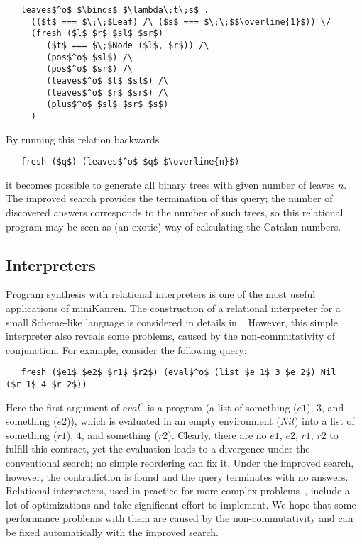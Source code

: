 \begin{lstlisting}
   leaves$^o$ $\binds$ $\lambda\;t\;s$ .
     (($t$ === $\;\;$Leaf) /\ ($s$ === $\;\;$$\overline{1}$)) \/
     (fresh ($l$ $r$ $sl$ $sr$)
        ($t$ === $\;$Node ($l$, $r$)) /\
        (pos$^o$ $sl$) /\
        (pos$^o$ $sr$) /\
        (leaves$^o$ $l$ $sl$) /\
        (leaves$^o$ $r$ $sr$) /\
        (plus$^o$ $sl$ $sr$ $s$)
     )
\end{lstlisting}

By running this relation backwards

\begin{lstlisting}
   fresh ($q$) (leaves$^o$ $q$ $\overline{n}$)
\end{lstlisting}

\noindent it becomes possible to generate all binary trees with given number of leaves $n$. 
The improved search provides the termination of this query; the number of discovered 
answers corresponds to the number of such trees, so this relational program may be seen 
as (an exotic) way of calculating the Catalan numbers.

\subsection{Interpreters}

Program synthesis with relational interpreters is one of the most useful applications of miniKanren. 
The construction of a relational interpreter for a small Scheme-like language is considered 
in details in~\cite{Untagged}. However, this simple interpreter also reveals some problems, caused by 
the non-commutativity of conjunction. For example, consider the following query:

\begin{lstlisting}
   fresh ($e1$ $e2$ $r1$ $r2$) (eval$^o$ (list $e_1$ 3 $e_2$) Nil ($r_1$ 4 $r_2$))
\end{lstlisting}

Here the first argument of $eval^o$ is a program (a list of something ($e1$), $3$, and something ($e2$)),
which is evaluated in an empty environment ($Nil$) into a list of  something ($r1$), $4$, and something ($r2$).
Clearly, there are no $e1$, $e2$, $r1$, $r2$ to fulfill this contract, yet the evaluation leads to a divergence
under the conventional search; no simple reordering can fix it. Under the improved search, however, the
contradiction is found and the query terminates with no answers. Relational interpreters, used in practice for
more complex problems~\cite{unified}, include a lot of optimizations and take significant effort to implement.
We hope that some performance problems with them are caused by the non-commutativity and can be fixed automatically 
with the improved search.

